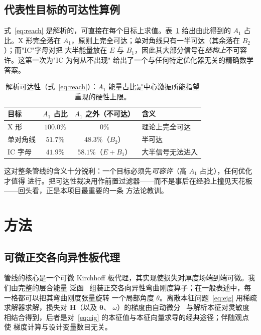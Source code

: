 \documentclass[11pt,a4paper]{article}
\newcommand{\Aone}{A_1}
\newcommand{\matH}{\mathbf{H}}
\begin{document}
\subsection{代表性目标的可达性算例}
式~\eqref{eq:reach} 是解析的，可直接在每个目标上求值。表~\ref{tab:reach} 给出由此得到的 $\Aone$
占比。X 形完全落在 $\Aone$，原则上完全可达；单对角线只有一半可达（其余落在 $B_2$）；而"IC"字母对把
大半能量放在 $E$ 与 $B_1$，因此其大部分信号在\emph{结构上}不可容许。这第一次为"IC 为何从不出现"
给出了一个与任何特定优化器无关的精确数学答案。

\begin{table}[h]
\centering
\caption{解析可达性（式~\eqref{eq:reach}）：$\Aone$ 能量占比是中心激振所能指望重现的硬性上限。}
\label{tab:reach}
\small
\begin{tabular}{@{}lccl@{}}
\toprule
目标 & $\Aone$ 占比 & $\Aone$ 之外（不可达） & 含义 \\
\midrule
X 形        & $100.0\%$ & $0\%$            & 理论上完全可达 \\
单对角线    & $51.7\%$  & $48.3\%$（$B_2$）& 半可达 \\
IC 字母     & $41.9\%$  & $58.1\%$（$E{+}B_1$）& 大半信号无法进入 \\
\bottomrule
\end{tabular}
\end{table}

\noindent 这对整条管线的含义十分锐利：一个目标必须先\emph{可容许}（高 $\Aone$ 占比），任何优化才值得
进行。把可达性裁决用作前置过滤器------而不是事后在经验上撞见天花板------回头看，正是本项目最重要的一条
方法论教训。

\section{方法}\label{sec:method}

\subsection{可微正交各向异性板代理}\label{sec:surrogate}
管线的核心是一个可微 Kirchhoff 板代理，其实现使损失对厚度场端到端可微。我们由完整的层合能量
泛函~\cite{reddy2003} 组装正交各向异性弯曲刚度算子；在一般表述中，每一格都可以把其弯曲刚度张量旋转
一个局部角度 $\theta$。离散本征问题~\eqref{eq:eig} 用稀疏求解器求解，损失对 $\matH$（以及 $\bm\theta$、
$\omega$）的梯度由自动微分~\cite{baydin2018,paszke2019} 与解析本征对灵敏度~\cite{fox1968,nelson1976}
相结合得到，后者是对~\eqref{eq:eig} 的本征值与本征向量求导的经典途径；伴随观点~\cite{giles2000} 使
梯度计算与设计变量数目无关。
\end{document}
